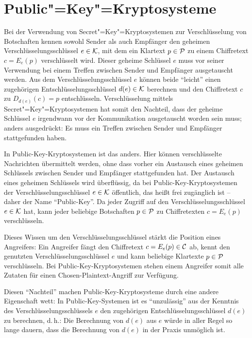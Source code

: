\chapter{Public"=Key"=Kryptosysteme}

Bei der Verwendung von Secret"=Key"=Kryptosystemen zur Verschlüsselung von Botschaften kennen sowohl Sender als auch Empfänger den geheimen Verschlüsselungsschlüssel $e \in \mathcal K$, mit dem ein Klartext $p \in \mathcal P$ zu einem Chiffretext $c = E_e(p)$ verschlüsselt wird. Dieser geheime Schlüssel $e$ muss vor seiner Verwendung bei einem Treffen zwischen Sender und Empfänger ausgetauscht werden. Aus dem Verschlüsselungsschlüssel $e$ können beide \enquote{leicht} einen zugehörigen Entschlüsselungsschlüssel $d(e) \in \mathcal K$ berechnen und den Chiffretext $c$ zu $D_{d(e)}(c)= p$ entschlüsseln. Verschlüsselung mittels Secret"=Key"=Kryptosystemen hat somit den Nachteil, dass der geheime Schlüssel $e$ irgendwann vor der Kommunikation ausgetauscht worden sein muss; anders ausgedrückt: Es muss ein Treffen zwischen Sender und Empfänger stattgefunden haben.

In Public-Key-Kryptosystemen ist das anders. Hier können verschlüsselte Nachrichten übermittelt werden, ohne dass vorher ein Austausch eines geheimen Schlüssels zwischen Sender und Empfänger stattgefunden hat. Der Austausch eines geheimen Schlüssels wird überflüssig, da bei Public-Key-Kryptosystemen der Verschlüsselungsschlüssel $e \in \mathcal K$ öffentlich, das heißt frei zugänglich ist -- daher der Name \enquote{Public-Key}. Da jeder Zugriff auf den Verschlüsselungsschlüssel $e \in \mathcal K$ hat, kann jeder beliebige Botschaften $p \in \mathcal P$ zu Chiffretexten $c = E_e(p)$ verschlüsseln. 

Dieses Wissen um den Verschlüsselungsschlüssel stärkt die Position eines Angreifers: Ein Angreifer fängt den Chiffretext $c = E_e(p) \in \mathcal C$ ab, kennt den genutzten Verschlüsselungsschlüssel $e$ und kann beliebige Klartexte $p \in \mathcal P$ verschlüsseln. Bei Public-Key-Kryptosystemen stehen einem Angreifer somit alle Zutaten für einen Chosen-Plaintext-Angriff zur Verfügung.

Diesen \enquote{Nachteil} machen Public-Key-Kryptosysteme durch eine andere Eigenschaft wett: In Public-Key-Systemen ist es \enquote{unzulässig} aus der Kenntnis des Verschlüsselungsschlüssels $e$ den zugehörigen Entschlüsselungsschlüssel $d(e)$ zu berechnen, d.\,h.: Die Berechnung von $d(e)$ aus $e$ würde in aller Regel so lange dauern, dass die Berechnung von $d(e)$ in der Praxis unmöglich ist.

